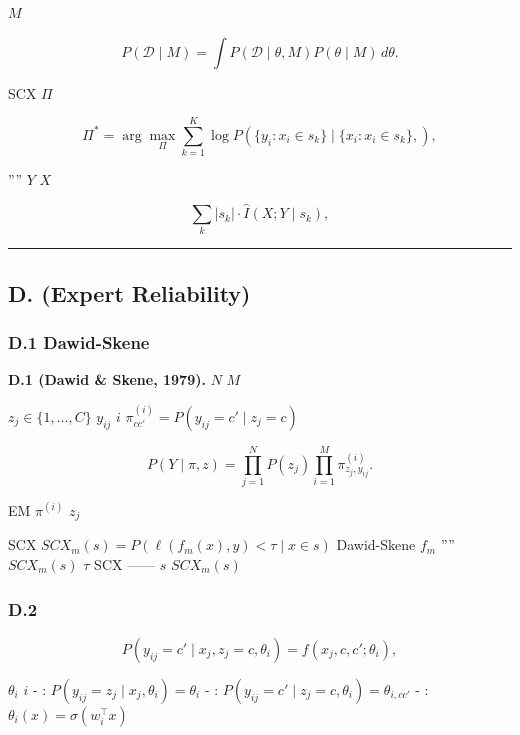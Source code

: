 \documentclass[
  12pt,
]{article}
\begin{document}
 \(M\) 

\[P(\mathcal{D} \mid M) = \int P(\mathcal{D} \mid \theta, M) P(\theta \mid M) \, d\theta.\]

SCX  \(\Pi\)
\textbf{}

\[\Pi^* = \arg\max_{\Pi} \sum_{k=1}^K \log P(\{y_i: x_i \in s_k\} \mid \{x_i: x_i \in s_k\}, \text{}),\]

'''' \(Y\)  \(X\)


\[\sum_{k} |s_k| \cdot \hat{I}(X; Y \mid s_k),\]



\begin{center}\rule{0.5\linewidth}{0.5pt}\end{center}

\subsection{D.  (Expert
Reliability)}\label{d.-ux4e13ux5bb6ux53efux9760ux6027-expert-reliability}

\subsubsection{D.1 Dawid-Skene }\label{d.1-dawid-skene-ux6a21ux578b}

\textbf{ D.1 (Dawid \& Skene, 1979).}  \(N\) \(M\)

\(z_j \in \{1, \dots, C\}\) \(y_{ij}\) \(i\)
 \(\pi^{(i)}_{cc'} = P(y_{ij} = c' \mid z_j = c)\)

\[P(Y \mid \pi, z) = \prod_{j=1}^N P(z_j) \prod_{i=1}^M \pi^{(i)}_{z_j, y_{ij}}.\]

 EM  \(\pi^{(i)}\)  \(z_j\)

SCX  \(SCX_m(s) = P(\ell(f_m(x), y) < \tau \mid x \in s)\) 
Dawid-Skene  \(f_m\) ''''\(SCX_m(s)\)
 \(\tau\)  SCX
\textbf{}------
\(s\)  \(SCX_m(s)\)

\subsubsection{D.2
}\label{d.2-ux6807ux6ce8ux8005ux5efaux6a21ux7684ux7edfux8ba1ux57faux7840}

\textbf{}

\[P(y_{ij} = c' \mid x_j, z_j = c, \theta_i) = f(x_j, c, c'; \theta_i),\]

 \(\theta_i\)  \(i\)  -
\textbf{}:
\(P(y_{ij} = z_j \mid x_j, \theta_i) = \theta_i\) -
\textbf{}:
\(P(y_{ij} = c' \mid z_j = c, \theta_i) = \theta_{i, cc'}\)
- \textbf{}:
\(\theta_i(x) = \sigma(w_i^\top x)\)
\end{document}
